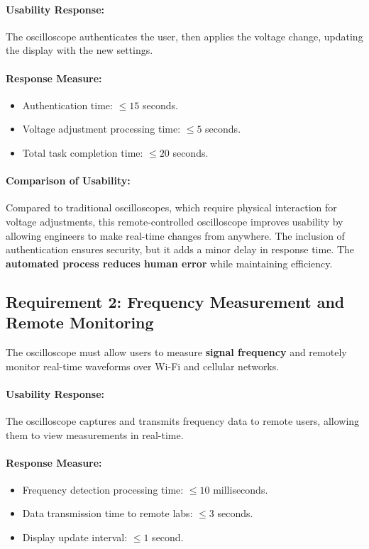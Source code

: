 \paragraph{\textbf{Usability Response:}}  
The oscilloscope authenticates the user, then applies the voltage change, updating the display with the new settings.

\paragraph{\textbf{Response Measure:}}  
\begin{itemize}
    \item Authentication time: $\leq 15$ seconds.
    \item Voltage adjustment processing time: $\leq 5$ seconds.
    \item Total task completion time: $\leq 20$ seconds.
\end{itemize}

\paragraph{\textbf{Comparison of Usability:}}  
Compared to traditional oscilloscopes, which require physical interaction for voltage adjustments, this remote-controlled oscilloscope improves usability by allowing engineers to make real-time changes from anywhere. The inclusion of authentication ensures security, but it adds a minor delay in response time. The \textbf{automated process reduces human error} while maintaining efficiency.

\subsection{Requirement 2: Frequency Measurement and Remote Monitoring}
The oscilloscope must allow users to measure \textbf{signal frequency} and remotely monitor real-time waveforms over Wi-Fi and cellular networks.

\paragraph{\textbf{Usability Response:}}  
The oscilloscope captures and transmits frequency data to remote users, allowing them to view measurements in real-time.

\paragraph{\textbf{Response Measure:}}  
\begin{itemize}
    \item Frequency detection processing time: $\leq 10$ milliseconds.
    \item Data transmission time to remote labs: $\leq 3$ seconds.
    \item Display update interval: $\leq 1$ second.
\end{itemize}

